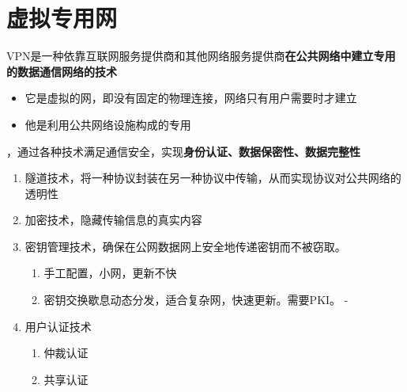 \chapter{虚拟专用网}
VPN是一种依靠互联网服务提供商和其他网络服务提供商\textbf{在公共网络中建立专用的数据通信网络的技术}
\begin{itemize}
	\item 它是虚拟的网，即没有固定的物理连接，网络只有用户需要时才建立
	\item 他是利用公共网络设施构成的专用
\end{itemize}

，通过各种技术满足通信安全，实现\textbf{身份认证、数据保密性、数据完整性}
\begin{enumerate}
	\item 隧道技术，将一种协议封装在另一种协议中传输，从而实现协议对公共网络的透明性
	\item 加密技术，隐藏传输信息的真实内容
	\item 密钥管理技术，确保在公网数据网上安全地传递密钥而不被窃取。
	\begin{enumerate}
		\item 手工配置，小网，更新不快
		\item 密钥交换歇息动态分发，适合复杂网，快速更新。需要PKI。
-	\end{enumerate}
	\item 用户认证技术
	\begin{enumerate}
		\item 仲裁认证
		\item 共享认证
	\end{enumerate}
\end{enumerate}

